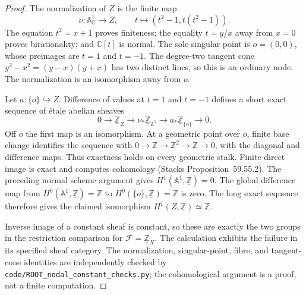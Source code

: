 \begin{proof}
The normalization of $Z$ is the finite map
\[
 \nu:\mathbb A^1_{\mathbb C}\longrightarrow Z,
 \qquad t\longmapsto (t^2-1,t(t^2-1)).
\]
The equation $t^2=x+1$ proves finiteness; the equality $t=y/x$
away from $x=0$ proves birationality; and $\mathbb C[t]$ is
normal. The sole singular point is $o=(0,0)$, whose preimages
are $t=1$ and $t=-1$. The degree-two tangent cone
$y^2-x^2=(y-x)(y+x)$ has two distinct lines, so this is an
ordinary node. The normalization is an isomorphism away from
$o$.

Let $a:\{o\}\hookrightarrow Z$. Difference of values at $t=1$
and $t=-1$ defines a short exact sequence of \'etale abelian
sheaves
\[
 0\longrightarrow\underline{\mathbb Z}_Z
 \longrightarrow\nu_*\underline{\mathbb Z}_{\mathbb A^1}
 \longrightarrow a_*\underline{\mathbb Z}_{\{o\}}
 \longrightarrow0.
\]
Off $o$ the first map is an isomorphism. At a geometric point
over $o$, finite base change identifies the sequence with
$0\to\mathbb Z\to\mathbb Z^2\to\mathbb Z\to0$, with the
diagonal and difference maps. Thus exactness holds on every
geometric stalk. Finite direct image is exact and computes
cohomology (Stacks Proposition~59.55.2). The preceding normal
scheme argument gives $H^1(\mathbb A^1,\underline{\mathbb Z})=0$.
The global difference map from
$H^0(\mathbb A^1,\underline{\mathbb Z})=\mathbb Z$ to
$H^0(\{o\},\underline{\mathbb Z})=\mathbb Z$ is zero.
The long exact sequence therefore gives the claimed isomorphism
$H^1(Z,\underline{\mathbb Z})\simeq\mathbb Z$.

Inverse image of a constant sheaf is constant, so these are exactly
the two groups in the restriction comparison for
$\mathcal F=\underline{\mathbb Z}_X$. The calculation exhibits
the failure in its specified sheaf category. The normalization,
singular-point, fibre, and tangent-cone identities are independently
checked by \texttt{code/ROOT\_nodal\_constant\_checks.py}; the
cohomological argument is a proof, not a finite computation.
\end{proof}

